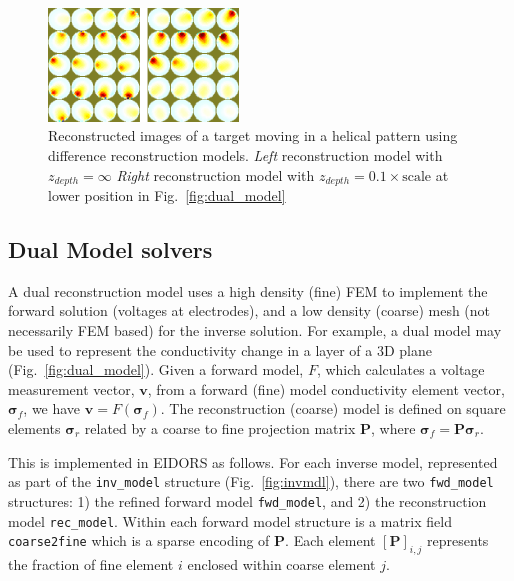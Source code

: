 \documentclass[12pt,draft]{iopart}
\newcommand{\vB}{\mbox{$\mathbf{v}$}}
\renewcommand{\PB}{\mbox{$\mathbf{P}$}}
\newcommand{\sG}{\mbox{${\boldsymbol \sigma}$}}
\begin{document}
\begin{figure}[tbh]
\begin{center}
 \includegraphics[width= 0.45\textwidth, bb=0 0 588 508]{../paper-EIT2008/figs/centre_slice04a_crop.png}
\caption{ \label{fig:dual_model_reconst}
\small
Reconstructed images of a target moving in a helical pattern using
difference reconstruction models.
{\em Left} reconstruction model with  $z_{depth}=\infty$
{\em Right} reconstruction model with $z_{depth}= 0.1\times \mbox{scale}$
at lower position in Fig.~\ref{fig:dual_model}
}
\end{center}
\vspace{-0.5cm}
\end{figure}

\subsection{Dual Model solvers}


A dual reconstruction model uses a high density (fine)
FEM to implement the forward solution (voltages
at electrodes), and a low density (coarse) mesh
(not necessarily FEM based) for the inverse
solution. For example, a dual model may be used to 
represent the conductivity change in a layer
of a 3D plane (Fig.~\ref{fig:dual_model}).
Given a forward model, $F$,
which calculates a voltage measurement vector, $\vB$, from
a forward (fine) model conductivity element vector, $\sG_f$, we
have $\vB = F( \sG_f )$. The reconstruction (coarse)
model is defined on square elements $\sG_r$ related by
a coarse to fine projection matrix $\PB$, where $\sG_f = \PB \sG_r$.

This is implemented in EIDORS as follows. For each
inverse model, represented as part of the {\tt inv\_model}
structure (Fig.~\ref{fig:invmdl}),
there are two {\tt fwd\_model} structures:
1) the refined forward model {\tt fwd\_model}, and
2) the reconstruction model {\tt rec\_model}. 
Within each forward model structure is a matrix field
{\tt coarse2fine} which is a sparse encoding of $\PB$.
Each element $[\PB]_{i,j}$ represents the fraction of
fine element $i$ enclosed within coarse element $j$.
\end{document}
